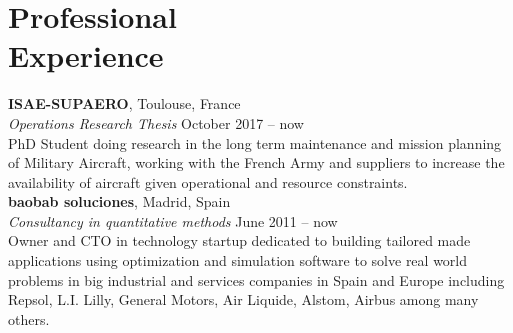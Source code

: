 		\section{Professional\\Experience}

		\textbf{ISAE-SUPAERO}, Toulouse, France \vspace{2mm}\\\vspace{1mm}%
	    \textsl{Operations Research Thesis}
	    	\hfill October 2017 -- now\\
	    PhD Student doing research in the long term maintenance and mission planning of Military Aircraft, working with the French Army and suppliers to increase the availability of aircraft given operational and resource constraints. \\

		\textbf{baobab soluciones}, Madrid, Spain \vspace{2mm}\\\vspace{1mm}%
	    \textsl{Consultancy in quantitative methods} 
	    	\hfill June 2011 -- now\\
	    Owner and CTO in technology startup dedicated to building tailored made applications using optimization and simulation software to solve real world problems in big industrial and services companies in Spain and Europe including Repsol, L.I. Lilly, General Motors, Air Liquide, Alstom, Airbus among many others.
    


